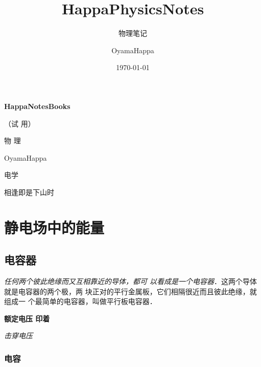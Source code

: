\documentclass[10pt,cn]{elegantbook}
\title{HappaPhysicsNotes}
\subtitle{物理笔记}
\author{OyamaHappa}
\date{\today}
\begin{document}
	
	\begin{titlepage}
		\begin{center}
			\vspace*{3cm}
			
			{\Large \textbf{HappaNotesBooks} }
			
			{\Large（试 用）}
			
			\vspace{1cm}
			
			{\Huge 物 \qquad 理}
			
			\vspace{0.5cm}
			
			
			
			
			
			
			\vspace{1cm}
			
			OyamaHappa
			
			
			\vspace{5cm}
			电学
			
			
			\vfill
			
			相逢即是下山时
			
			
			
		\end{center}
	\end{titlepage}
	
	
	\tableofcontents
	
	\mainmatter


\part{静电场中的能量}
\chapter{电容器}

\textit{任何两个彼此绝缘而又互相靠近的导体，都可
以看成是一个电容器}．这两个导体就是电容器的两个极，两
块正对的平行金属板，它们相隔很近而且彼此绝缘，就组成一
个最简单的电容器，叫做平行板电容器．

\textbf{额定电压 印着}

\textit{击穿电压}
 \section{电容}
\end{document}
